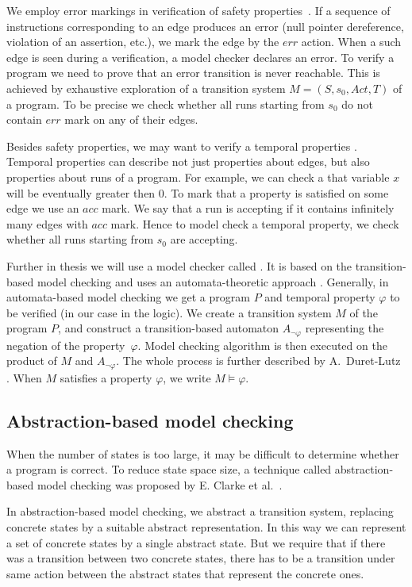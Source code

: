 We employ error markings in verification of safety properties~\cite{Manna92}.  If a
sequence of instructions corresponding to an edge produces an error (null
pointer dereference, violation of an assertion, etc.), we mark the edge by the
$err$ action. When a such edge is seen during a verification, a model checker
declares an error. To verify a program we need to prove that an error transition
is never reachable. This is achieved by exhaustive exploration of a transition
system $M = (S, s_0, Act, T)$ of a program. To be precise we check whether all
runs starting from $s_0$ do not contain $err$ mark on any of their edges.

Besides safety properties, we may want to verify a temporal properties
\cite{Manna92}. Temporal properties can describe not just properties about
edges, but also properties about runs of a program. For example, we can check a
that variable $x$ will be eventually greater then 0. To mark that a property is
satisfied on some edge we use an $acc$ mark. We say that a run is accepting if
it contains infinitely many edges with $acc$ mark. Hence to model check a
temporal property, we check whether all runs starting from $s_0$ are accepting.

Further in thesis we will use a model checker called \DIVINE. It is based on the
transition-based model checking and uses an automata-theoretic approach
\cite{Vardi96}. Generally, in automata-based model checking we get a program $P$
and temporal property $\varphi$ to be verified (in our case in the \LTL logic).
We create a transition system $M$ of the program $P$, and construct a
transition-based automaton $A_{\neg \varphi}$ representing the negation of the
property~$\varphi$. Model checking algorithm is then executed on the product of
$M$ and $A_{\neg \varphi}$. The whole process is further described by
A.~Duret-Lutz \cite{Duret04}. When $M$ satisfies a property $\varphi$, we write
$M \models \varphi$.

\subsection{Abstraction-based model checking} \label{subsec:amc}

When the number of states is too large, it may be difficult to determine whether a
program is correct. To reduce state space size, a technique called
abstraction-based model checking was proposed by E. Clarke et al.~\cite{Clarke94}.

In abstraction-based model checking, we abstract a transition system, replacing
concrete states by a suitable abstract representation. In this way we can
represent a set of concrete states by a single abstract state. But we require
that if there was a transition between two concrete states, there has to be a
transition under same action between the abstract states that represent the
concrete ones.

